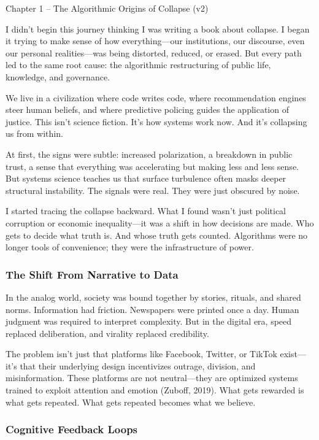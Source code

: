 {Chapter 1 -- The Algorithmic Origins of Collapse (v2)}

I didn't begin this journey thinking I was writing a book about collapse. I began it trying to make sense of how everything---our institutions, our discourse, even our personal realities---was being distorted, reduced, or erased. But every path led to the same root cause: the algorithmic restructuring of public life, knowledge, and governance.

We live in a civilization where code writes code, where recommendation engines steer human beliefs, and where predictive policing guides the application of justice. This isn't science fiction. It's how systems work now. And it's collapsing us from within.

At first, the signs were subtle: increased polarization, a breakdown in public trust, a sense that everything was accelerating but making less and less sense. But systems science teaches us that surface turbulence often masks deeper structural instability. The signals were real. They were just obscured by noise.

I started tracing the collapse backward. What I found wasn't just political corruption or economic inequality---it was a shift in how decisions are made. Who gets to decide what truth is. And whose truth gets counted. Algorithms were no longer tools of convenience; they were the infrastructure of power.

\subsubsection{The Shift From Narrative to Data}\label{the-shift-from-narrative-to-data}

In the analog world, society was bound together by stories, rituals, and shared norms. Information had friction. Newspapers were printed once a day. Human judgment was required to interpret complexity. But in the digital era, speed replaced deliberation, and virality replaced credibility.

The problem isn't just that platforms like Facebook, Twitter, or TikTok exist---it's that their underlying design incentivizes outrage, division, and misinformation. These platforms are not neutral---they are optimized systems trained to exploit attention and emotion (Zuboff, 2019). What gets rewarded is what gets repeated. What gets repeated becomes what we believe.

\subsubsection{Cognitive Feedback Loops}\label{cognitive-feedback-loops}

